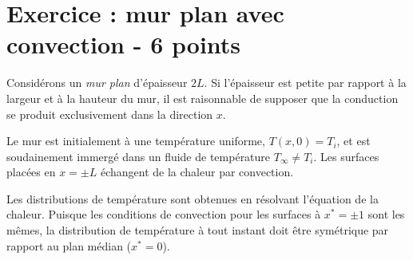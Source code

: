 \documentclass[a4paper, 12pt]{article}
\begin{document}
\section{Exercice : mur plan avec convection - 6 points}

Considérons un \textit{mur plan} d'épaisseur $2L$. Si l'épaisseur est petite par rapport à la largeur et à la hauteur du mur, il est raisonnable de supposer que la conduction se produit exclusivement dans la direction $x$. 

Le mur est initialement à une température uniforme, $T(x, 0) = T_i$, et est soudainement immergé dans un fluide de température $T_\infty \neq T_i$. Les surfaces placées en $x=\pm L$ échangent de la chaleur
par convection.

Les distributions de température sont obtenues en résolvant l'équation de la chaleur. Puisque les conditions de convection pour les surfaces à $x^* = \pm 1$ sont les mêmes, la distribution de température à tout instant doit être symétrique par rapport au plan médian ($x^* = 0$). 
\end{document}
